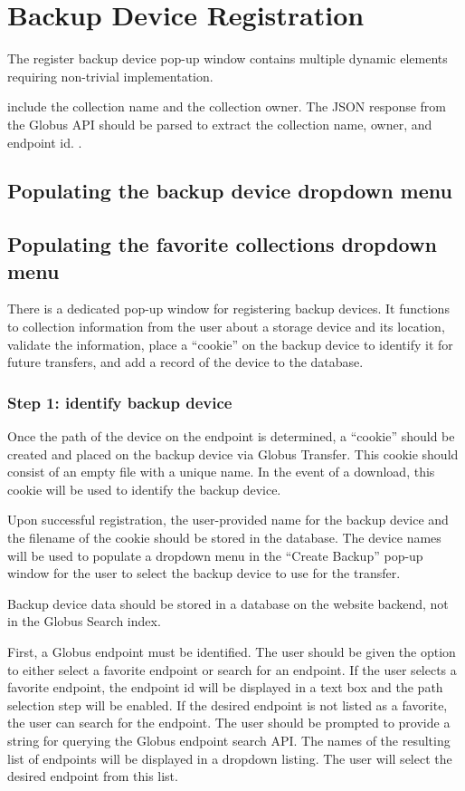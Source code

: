 
\section{Backup Device Registration}

The register backup device pop-up window contains multiple dynamic elements requiring
non-trivial implementation.

include the
collection name and the collection owner. The JSON response from the Globus
API should be parsed to extract the collection name, owner, and endpoint
id. .

\subsection{Populating the backup device dropdown menu}

\subsection{Populating the favorite collections dropdown menu}

There is a dedicated pop-up window for registering backup devices. It functions
to collection information from the user about a storage device and its location,
validate the information, place a ``cookie'' on the backup device to identify it 
for future transfers, and add a record of the device to the database.

\subsubsection{Step 1: identify backup device}

Once the path of the device on the endpoint is determined, a ``cookie'' 
should be created and placed on the backup device via Globus Transfer. This cookie 
should consist of an empty file with a unique name. In the event of a download, this 
cookie will be used to identify the backup device.

Upon successful registration, the user-provided name for the backup device and the 
filename of the cookie should be stored in the database. The device names will be 
used to populate a dropdown menu in the ``Create Backup'' pop-up window for the
user to select the backup device to use for the transfer.

Backup device data should be stored in a database on the website backend, not in
the Globus Search index.

First, a Globus endpoint must be identified. The user should be given the option
to either select a favorite endpoint or search for an endpoint. If the user
selects a favorite endpoint, the endpoint id will be displayed in a text box
and the path selection step will be enabled. If the desired endpoint is not
listed as a favorite, the user can search for the endpoint.
The user should be prompted to provide
a string for querying the Globus endpoint search API. The names of the resulting 
list of endpoints will be displayed in a dropdown listing. The user will select
the desired endpoint from this list.

